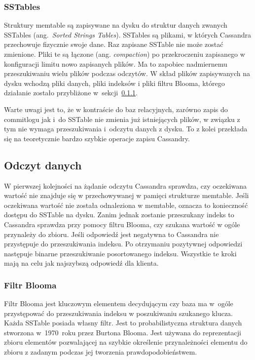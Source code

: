 \subsubsection{SSTables}

Struktury memtable są zapisywane na dysku do struktur danych zwanych SSTables (ang.~\textit{Sorted Strings Tables}).
SSTables są plikami, w których Cassandra przechowuje fizycznie swoje dane.
Raz zapisane SSTable nie może zostać zmienione.
Pliki te są łączone (ang. \textit{compaction}) po przekroczeniu zapisanego w konfiguracji limitu nowo zapisanych plików.
Ma to zapobiec nadmiernemu przeszukiwaniu wielu plików podczas odczytów.
W skład plików zapisywanych na dysku wchodzą pliki danych, pliki indeksów i pliki filtru Blooma, którego działanie zostało przybliżone w~sekcji~\ref{sec:cassandraBloomFilter}.

Warte uwagi jest to, że w kontraście do baz relacyjnych, zarówno zapis do commitlogu jak i~do SSTable nie zmienia już istniejących plików, w związku z tym nie wymaga przeszukiwania i~odczytu danych z dysku.
To z kolei przekłada się na teoretycznie bardzo szybkie operacje zapisu Cassandry.

\subsection{Odczyt danych}

W pierwszej kolejności na żądanie odczytu Cassandra sprawdza, czy oczekiwana wartość nie znajduje się w przechowywanej w pamięci strukturze memtable.
Jeśli oczekiwana wartość nie została odnaleziona w memtable, oznacza to konieczność dostępu do SSTable na dysku.
Zanim jednak zostanie przeszukany indeks to Cassandra sprawdza przy pomocy filtru Blooma, czy szukana wartość w ogóle przynależy do zbioru. 
Jeśli odpowiedź jest negatywna to Cassandra nie przystępuje do przeszukiwania indeksu.
Po otrzymaniu pozytywnej odpowiedzi następuje binarne przeszukiwanie posortowanego indeksu.
Wszystkie te kroki mają na celu jak najszybszą odpowiedź dla klienta.

\subsubsection{Filtr Blooma} \label{sec:cassandraBloomFilter}

Filtr Blooma jest kluczowym elementem decydującym czy baza ma w~ogóle przystępować do przeszukiwania indeksu w poszukiwaniu szukanego klucza.
Każda SSTable posiada własny filtr.
Jest to probabilistyczna struktura danych stworzona w~1970~roku przez Burtona Blooma.
Jest używana do reprezentacji zbioru elementów pozwalającej na szybkie określenie przynależności elementu do zbioru z zadanym podczas jej tworzenia prawdopodobieństwem.

